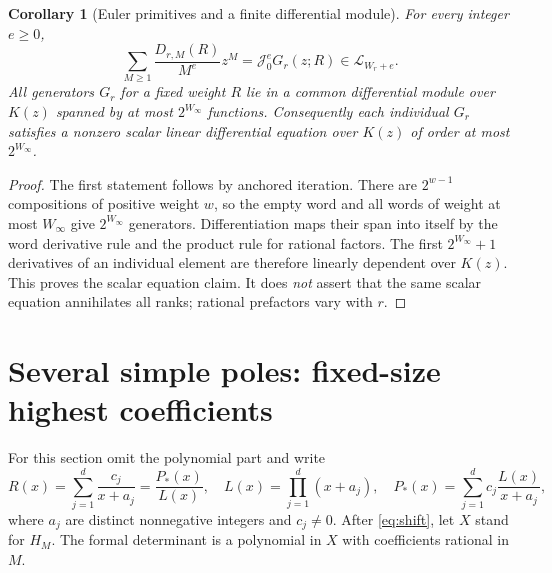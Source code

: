 \documentclass[11pt,letterpaper]{article}
\numberwithin{equation}{section}
\newtheorem{corollary}[theorem]{Corollary}
\theoremstyle{definition}\newtheorem{definition}[theorem]{Definition}
\theoremstyle{remark}\newtheorem{remark}[theorem]{Remark}
\begin{document}
\begin{corollary}[Euler primitives and a finite differential module]
\label{thm:dmodule}
For every integer $e\ge0$,
\begin{equation}\label{eq:eulerprimitive}
 \sum_{M\ge1}\frac{D_{r,M}(R)}{M^e}z^M
             =\mathcal J_0^eG_r(z;R)\in\mathscr L_{W_r+e}.
\end{equation}
All generators $G_r$ for a fixed weight $R$ lie in a common differential
module over $K(z)$ spanned by at most $2^{W_\infty}$ functions.
Consequently each individual $G_r$ satisfies a nonzero scalar linear
differential equation over $K(z)$ of order at most $2^{W_\infty}$.
\end{corollary}
\begin{proof}
The first statement follows by anchored iteration. There are
$2^{w-1}$ compositions of positive weight $w$, so the empty word and
all words of weight at most $W_\infty$ give $2^{W_\infty}$ generators.
Differentiation maps their span into itself by the word derivative
rule and the product rule for rational factors. The first
$2^{W_\infty}+1$ derivatives of an individual element are therefore
linearly dependent over $K(z)$. This proves the scalar equation claim.
It does \emph{not} assert that the same scalar equation annihilates
all ranks; rational prefactors vary with $r$.
\end{proof}

\section{Several simple poles: fixed-size highest coefficients}
\label{sec:hahn}

For this section omit the polynomial part and write
\begin{equation}\label{eq:simpleR}
 R(x)=\sum_{j=1}^d\frac{c_j}{x+a_j}=\frac{P_*(x)}{L(x)},
 \quad L(x)=\prod_{j=1}^d(x+a_j),\quad
 P_*(x)=\sum_{j=1}^d c_j\frac{L(x)}{x+a_j},
\end{equation}
where $a_j$ are distinct nonnegative integers and $c_j\ne0$.
After \eqref{eq:shift}, let $X$ stand for $H_M$. The formal determinant
is a polynomial in $X$ with coefficients rational in $M$.
\end{document}
